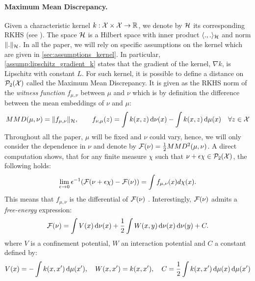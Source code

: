 \paragraph{Maximum Mean Discrepancy.}\label{subsec:MMD} Given a characteristic kernel $k : {{\mathcal X}} \times {{\mathcal X}} \to {{\mathbb R}}$, we denote by ${{\mathcal H}}$ its corresponding RKHS (see \cite{smola1998learning}). The space ${{\mathcal H}}$ is a Hilbert space with inner product $\langle .,. \rangle_{{{\mathcal H}}}$ and norm $\Vert . \Vert_{{{\mathcal H}}}$. In all the paper, we will rely on specific assumptions on the kernel which are given in \cref{sec:assumptions_kernel}. In particular, \cref{assump:lipschitz_gradient_k} states that the gradient of the kernel, $\nabla k$, is Lipschitz with constant $L$. For such kernel, it is possible to define a distance on $\mathcal{P}_2({{\mathcal X}})$ called the Maximum Mean Discrepancy. It is given as the RKHS norm of the \textit{witness function} $f_{\mu,\nu}$ between $\mu$ and $\nu$ which is by definition the difference between the mean embeddings of $\nu$ and $\mu$:
\begin{align}\label{eq:witness_function}
MMD(\mu,\nu) = \Vert f_{\mu,\nu} \Vert_{{{\mathcal H}}}, \qquad f_{\nu,\mu}(z) = \int k(x,z)\mathop{}\!\mathrm{d} \nu(x) - \int k(x,z)\mathop{}\!\mathrm{d} \mu(x)  \quad \forall z\in {{\mathcal X}}
\end{align}
Throughout all the paper, $\mu$ will be fixed and $\nu$ could vary, hence, we will only consider the dependence in $\nu$ and denote by ${{\mathcal F}}(\nu)= \frac{1}{2}MMD^2(\mu,\nu)$. 
A direct computation shows, that for any %
finite measure $\chi$ such that $\nu + \epsilon \chi \in {{\mathcal P}}_2({{\mathcal X}})$, the following holds:
\begin{align}\label{prop:differential_mmd}
		\lim_{\epsilon\rightarrow 0} \epsilon^{-1}({{\mathcal F}}(\nu +\epsilon\chi) - {{\mathcal F}}(\nu)) = \int f_{\mu,\nu}(x)d\chi(x).
	\end{align}
This means that $f_{\mu,\nu}$ is the differential of ${{\mathcal F}}(\nu)$ .  %
 Interestingly, ${{\mathcal F}}(\nu)$ admits a \textit{free-energy} expression:
\begin{align}\label{eq:mmd_as_free_energy}
	{{\mathcal F}}(\nu) = \int V(x) \mathop{}\!\mathrm{d} \nu(x) +\frac{1}{2} \int W(x,y)\mathop{}\!\mathrm{d} \nu(x)\mathop{}\!\mathrm{d} \nu(y) + C.
\end{align}
where $V$ is a confinement potential, $W$ an interaction potential and $C$ a constant defined by:
\begin{align}\label{eq:potentials}
V(x)=-\int  k(x,x')\mathop{}\!\mathrm{d}\mu(x'), \quad
W(x,x')=k(x,x'), \quad
C = \frac{1}{2} \int k(x,x')\mathop{}\!\mathrm{d}\mu(x) \mathop{}\!\mathrm{d}\mu(x') 
\end{align}
